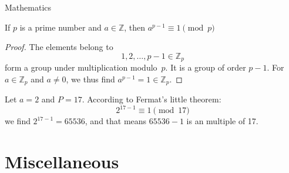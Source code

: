 \documentclass{beamer}
\begin{document}
\begin{frame}{Mathematics}	
	\scriptsize	
	\begin{theorem}
		If $p$ is a prime number and $a\in\mathbb{Z}$, then $a^{p-1}\equiv 1 \pmod{p}$
	\end{theorem}
	
	\begin{proof}
		The elements belong to 		
		$$1, 2, \ldots, p - 1 \in \mathbb{Z}_p$$		
		form a group under multiplication modulo~$p$. It is a group of order $p - 1$.
		For $a \in \mathbb{Z}_p$ and $a \neq 0$, we thus find $a^{p-1} = 1 \in \mathbb{Z}_p$.
	\end{proof}
	
	\begin{example}
		Let $a = 2$ and $P = 17$. According to Fermat's little theorem: 		
		$$2^{17-1} \equiv 1 \pmod{17}$$		
		we find $2^{17-1}= 65536$, and that means $65536-1$ is an multiple of 17.
		
		\hfill \cite{Hosch09} 	
	\end{example}    
\end{frame}

\section{Miscellaneous}
\SectionPage
\end{document}
